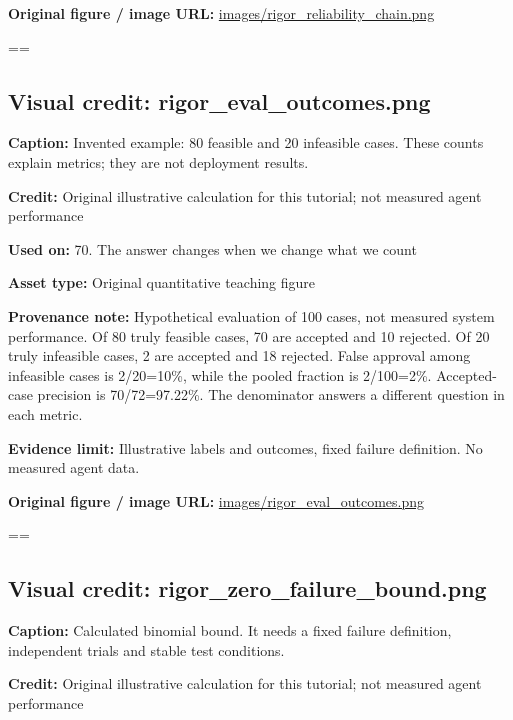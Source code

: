 \documentclass[10pt,letterpaper]{article}
\begin{document}
\textbf{Original figure / image URL:} \href{images/rigor_reliability_chain.png}{\small\ttfamily images/\allowbreak{}rigor\_\allowbreak{}reliability\_\allowbreak{}chain.\allowbreak{}png}\par
\egroup\par\noindent\box\readingEntry\par\medskip
\setbox\readingEntry=\vbox\bgroup\hsize=\linewidth\subsection*{Visual credit: rigor\_eval\_outcomes.png}
\textbf{Caption:} Invented example: 80 feasible and 20 infeasible cases. These counts explain metrics; they are not deployment results.\par
\textbf{Credit:} Original illustrative calculation for this tutorial; not measured agent performance\par
\textbf{Used on:} 70. The answer changes when we change what we count\par
\textbf{Asset type:} Original quantitative teaching figure\par
\textbf{Provenance note:} Hypothetical evaluation of 100 cases, not measured system performance. Of 80 truly feasible cases, 70 are accepted and 10 rejected. Of 20 truly infeasible cases, 2 are accepted and 18 rejected. False approval among infeasible cases is 2/20=10\%, while the pooled fraction is 2/100=2\%. Accepted-case precision is 70/72=97.22\%. The denominator answers a different question in each metric.\par
\textbf{Evidence limit:} Illustrative labels and outcomes, fixed failure definition. No measured agent data.\par
\textbf{Original figure / image URL:} \href{images/rigor_eval_outcomes.png}{\small\ttfamily images/\allowbreak{}rigor\_\allowbreak{}eval\_\allowbreak{}outcomes.\allowbreak{}png}\par
\egroup\par\noindent\box\readingEntry\par\medskip
\setbox\readingEntry=\vbox\bgroup\hsize=\linewidth\subsection*{Visual credit: rigor\_zero\_failure\_bound.png}
\textbf{Caption:} Calculated binomial bound. It needs a fixed failure definition, independent trials and stable test conditions.\par
\textbf{Credit:} Original illustrative calculation for this tutorial; not measured agent performance\par
\end{document}

